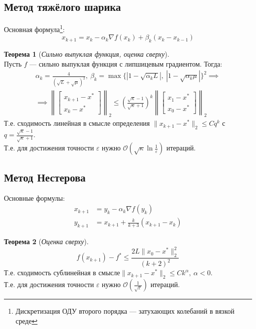 \documentclass[11pt,a4paper]{report}
\def\eps{\varepsilon}
\def\le{\leqslant}
\theoremstyle{definition}
\theoremstyle{definition}
\newtheorem{theorem}{Теорема}[section]
\theoremstyle{definition}
\begin{document}
	\subsection{Метод тяжёлого шарика}
	Основная формула\footnote{Дискретизация ОДУ второго порядка — затухающих колебаний в вязкой среде}:
	$$
		x_{k+1} = x_{k} - \alpha_k \nabla f(x_k) + \beta_k (x_k - x_{k-1})	
	$$
	\begin{theorem}[\textit{Сильно выпуклая функция, оценка сверху}]$  $\\
		Пусть $ f $ — сильно выпуклая функция с липшицевым градиентом. Тогда:
		\begin{gather*}
			\alpha_k = \frac{4}{(\sqrt{L} + \sqrt{\mu})^2},\ \beta_k = \max \{ |1 - \sqrt{\alpha_k L}|,\ |1 - \sqrt{\alpha_k \mu}|\}^2 \implies \\
			\implies \left \| \begin{bmatrix}
				x_{k+1} - x^{*}\\
				x_{k} - x^{*}
			\end{bmatrix} \right \|_{2} \le \left( \frac{\sqrt{\kappa} - 1}{\sqrt{\kappa} + 1} \right) ^ k \left \| \begin{bmatrix}
			x_{1} - x^{*}\\
			x_{0} - x^{*}
			\end{bmatrix} \right \|_{2}
		\end{gather*}
		Т.е. сходимость линейная в смысле определения $ \| x_{k+1} - x^{*} \|_2 \le Cq^{k}$ с $ q = \frac{\sqrt{\kappa} - 1}{\sqrt{\kappa} + 1} $.\\
		Т.е. для достижения точности $ \eps $ нужно $ \mathcal{O}\left( \sqrt{\kappa} \ln \frac{1}{\eps} \right) $ итераций.
	\end{theorem}
	\subsection{Метод Нестерова}
	Основные формулы:
	\begin{align*}
		x_{k+1} &= y_{k} - \alpha_k \nabla f(y_{k})\\
		y_{k+1} &= x_{k+1} + \frac{k}{k+3} (x_{k+1} - x_{k})
	\end{align*}
	\begin{theorem}[\textit{Оценка сверху}]$  $\\
		$$
			f(x_{k+1}) - f^{*} \le \frac{2L \| x_{0} - x^{*} \|_2^2 }{(k+2)^2}
		$$
		Т.е. сходимость сублинейная в смысле$ \| x_{k+1} - x^{*} \|_2 \le Ck^{\alpha},\ \alpha < 0 $.\\
		Т.е. для достижения точности $ \eps $ нужно $ \mathcal{O}\left( \frac{1}{\sqrt{\eps}} \right) $ итераций.
	\end{theorem}
\end{document}
